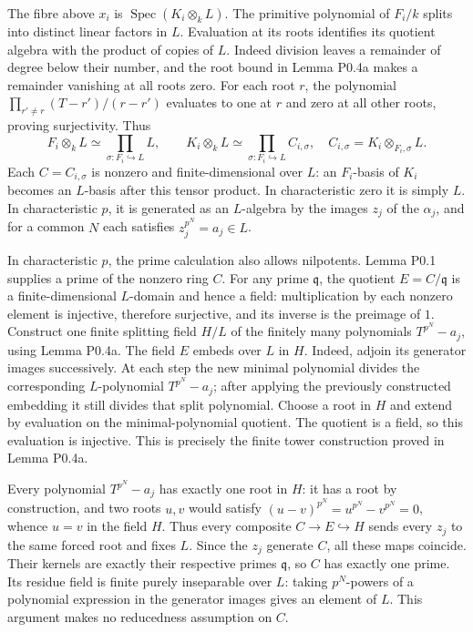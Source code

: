 \documentclass[11pt,a4paper,openany]{report}
\begin{document}
The fibre above \(x_i\) is \(\operatorname{Spec}(K_i\otimes_kL)\). The primitive polynomial of \(F_i/k\) splits into distinct linear factors in \(L\). Evaluation at its roots identifies its quotient algebra with the product of copies of \(L\). Indeed division leaves a remainder of degree below their number, and the root bound in Lemma P0.4a makes a remainder vanishing at all roots zero. For each root \(r\), the polynomial \(\prod_{r'\ne r}(T-r')/(r-r')\) evaluates to one at \(r\) and zero at all other roots, proving surjectivity. Thus \[
F_i\otimes_kL\simeq\prod_{\sigma:F_i\hookrightarrow L}L,\qquad
K_i\otimes_kL\simeq\prod_{\sigma:F_i\hookrightarrow L}C_{i,\sigma},\quad
C_{i,\sigma}=K_i\otimes_{F_i,\sigma}L.
\] Each \(C=C_{i,\sigma}\) is nonzero and finite-dimensional over \(L\): an \(F_i\)-basis of \(K_i\) becomes an \(L\)-basis after this tensor product. In characteristic zero it is simply \(L\). In characteristic \(p\), it is generated as an \(L\)-algebra by the images \(z_j\) of the \(\alpha_j\), and for a common \(N\) each satisfies \(z_j^{p^N}=a_j\in L\).

In characteristic \(p\), the prime calculation also allows nilpotents. Lemma P0.1 supplies a prime of the nonzero ring \(C\). For any prime \(\mathfrak q\), the quotient \(E=C/\mathfrak q\) is a finite-dimensional \(L\)-domain and hence a field: multiplication by each nonzero element is injective, therefore surjective, and its inverse is the preimage of \(1\). Construct one finite splitting field \(H/L\) of the finitely many polynomials \(T^{p^N}-a_j\), using Lemma P0.4a. The field \(E\) embeds over \(L\) in \(H\). Indeed, adjoin its generator images successively. At each step the new minimal polynomial divides the corresponding \(L\)-polynomial \(T^{p^N}-a_j\); after applying the previously constructed embedding it still divides that split polynomial. Choose a root in \(H\) and extend by evaluation on the minimal-polynomial quotient. The quotient is a field, so this evaluation is injective. This is precisely the finite tower construction proved in Lemma P0.4a.

Every polynomial \(T^{p^N}-a_j\) has exactly one root in \(H\): it has a root by construction, and two roots \(u,v\) would satisfy \((u-v)^{p^N}=u^{p^N}-v^{p^N}=0\), whence \(u=v\) in the field \(H\). Thus every composite \(C\to E\hookrightarrow H\) sends every \(z_j\) to the same forced root and fixes \(L\). Since the \(z_j\) generate \(C\), all these maps coincide. Their kernels are exactly their respective primes \(\mathfrak q\), so \(C\) has exactly one prime. Its residue field is finite purely inseparable over \(L\): taking \(p^N\)-powers of a polynomial expression in the generator images gives an element of \(L\). This argument makes no reducedness assumption on \(C\).
\end{document}
